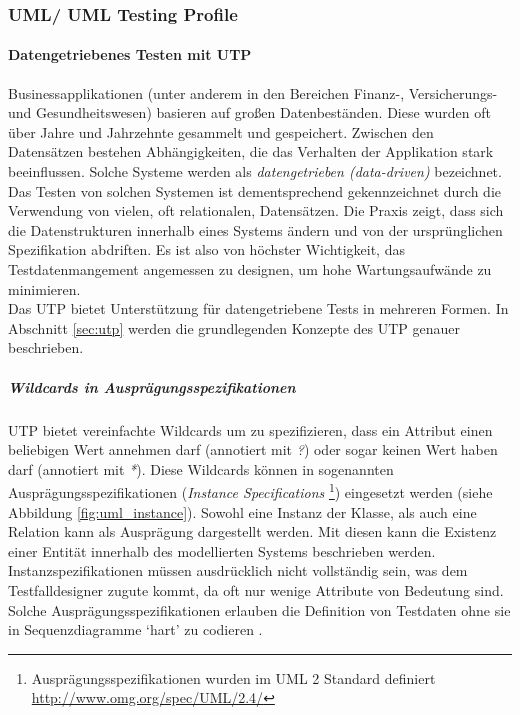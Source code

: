 \subsubsection{UML/ UML Testing Profile}
\paragraph{Datengetriebenes Testen mit UTP} 
Businessapplikationen (unter anderem in den Bereichen Finanz-, Versicherungs- und Gesundheitswesen) basieren auf großen Datenbeständen. Diese wurden oft über Jahre und Jahrzehnte gesammelt und gespeichert. Zwischen den Datensätzen bestehen Abhängigkeiten, die das Verhalten der Applikation stark beeinflussen. Solche Systeme werden als \textit{datengetrieben (data-driven)} bezeichnet. Das Testen von solchen Systemen ist dementsprechend gekennzeichnet durch die Verwendung von vielen, oft relationalen, Datensätzen. Die Praxis zeigt, dass sich die Datenstrukturen innerhalb eines Systems ändern und von der ursprünglichen Spezifikation abdriften. Es ist also von höchster Wichtigkeit, das Testdatenmangement angemessen zu designen, um hohe Wartungsaufwände zu minimieren. \cite{baker_model-driven_2005}\\
Das \Gls{UTP} bietet Unterstützung für datengetriebene Tests in mehreren Formen. In Abschnitt \ref{sec:utp} werden die grundlegenden Konzepte des \Gls{UTP} genauer beschrieben.

\subparagraph{Wildcards in Ausprägungsspezifikationen}
\Gls{UTP} bietet vereinfachte Wildcards um zu spezifizieren, dass ein Attribut einen beliebigen Wert annehmen darf (annotiert mit \textit{?}) oder sogar keinen Wert haben darf (annotiert mit \textit{*}). Diese Wildcards können in sogenannten Ausprägungsspezifikationen (\textit{Instance Specifications} \footnote{Ausprägungsspezifikationen wurden im UML 2 Standard definiert \url{http://www.omg.org/spec/UML/2.4/} }) eingesetzt werden (siehe Abbildung \ref{fig:uml_instance}). Sowohl eine Instanz der Klasse, als auch eine Relation kann als Ausprägung dargestellt werden. Mit diesen kann die Existenz einer Entität innerhalb des modellierten Systems beschrieben werden. Instanzspezifikationen müssen ausdrücklich nicht vollständig sein, was dem  Testfalldesigner zugute kommt, da oft nur wenige Attribute von Bedeutung sind. Solche Ausprägungsspezifikationen erlauben die Definition von Testdaten ohne sie in Sequenzdiagramme `hart' zu codieren \cite{_model-driven_2007}.
 
